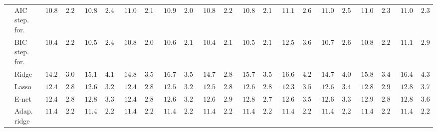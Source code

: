 \begin{tabular}{llllllllllllllllllllll}
	& AIC step. for.  & $\phantom{0}10.882$ & $\phantom{0}2.223$ & $\phantom{0}10.874$ & $\phantom{0}2.487$ & $\phantom{0}11.015$ & $\phantom{0}2.151$ & $\phantom{0}10.903$ & $\phantom{0}2.093$ & $\phantom{0}10.831$ & $\phantom{0}2.217$ & $\phantom{0}10.816$ & $\phantom{0}2.190$ & $\phantom{0}11.148$ & $\phantom{0}2.678$ & $\phantom{0}11.010$ & $\phantom{0}2.523$ & $\phantom{0}11.022$ & $\phantom{0}2.355$ & $\phantom{0}11.032$ & $\phantom{0}2.309$ \\
	& BIC step. for.  & $\phantom{0}10.430$ & $\phantom{0}2.272$ & $\phantom{0}10.569$ & $\phantom{0}2.438$ & $\phantom{0}10.822$ & $\phantom{0}2.084$ & $\phantom{0}10.674$ & $\phantom{0}2.187$ & $\phantom{0}10.434$ & $\phantom{0}2.102$ & $\phantom{0}10.537$ & $\phantom{0}2.125$ & $\phantom{0}12.520$ & $\phantom{0}3.690$ & $\phantom{0}10.759$ & $\phantom{0}2.600$ & $\phantom{0}10.812$ & $\phantom{0}2.296$ & $\phantom{0}11.144$ & $\phantom{0}2.978$ \\
	& Ridge  & $\phantom{0}14.277$ & $\phantom{0}3.091$ & $\phantom{0}15.172$ & $\phantom{0}4.146$ & $\phantom{0}14.822$ & $\phantom{0}3.577$ & $\phantom{0}16.744$ & $\phantom{0}3.571$ & $\phantom{0}14.733$ & $\phantom{0}2.883$ & $\phantom{0}15.737$ & $\phantom{0}3.583$ & $\phantom{0}16.693$ & $\phantom{0}4.239$ & $\phantom{0}14.737$ & $\phantom{0}4.027$ & $\phantom{0}15.851$ & $\phantom{0}3.455$ & $\phantom{0}16.429$ & $\phantom{0}4.332$ \\
	& Lasso  & $\phantom{0}12.491$ & $\phantom{0}2.899$ & $\phantom{0}12.648$ & $\phantom{0}3.262$ & $\phantom{0}12.484$ & $\phantom{0}2.851$ & $\phantom{0}12.557$ & $\phantom{0}3.285$ & $\phantom{0}12.500$ & $\phantom{0}2.852$ & $\phantom{0}12.693$ & $\phantom{0}2.869$ & $\phantom{0}12.366$ & $\phantom{0}3.500$ & $\phantom{0}12.618$ & $\phantom{0}3.418$ & $\phantom{0}12.834$ & $\phantom{0}2.919$ & $\phantom{0}12.849$ & $\phantom{0}3.744$ \\
	& E-net  & $\phantom{0}12.461$ & $\phantom{0}2.874$ & $\phantom{0}12.868$ & $\phantom{0}3.302$ & $\phantom{0}12.424$ & $\phantom{0}2.817$ & $\phantom{0}12.677$ & $\phantom{0}3.273$ & $\phantom{0}12.664$ & $\phantom{0}2.936$ & $\phantom{0}12.810$ & $\phantom{0}2.755$ & $\phantom{0}12.620$ & $\phantom{0}3.569$ & $\phantom{0}12.695$ & $\phantom{0}3.302$ & $\phantom{0}12.918$ & $\phantom{0}2.802$ & $\phantom{0}12.808$ & $\phantom{0}3.678$ \\
	& Adap. ridge  & $\phantom{0}11.482$ & $\phantom{0}2.257$ & $\phantom{0}11.483$ & $\phantom{0}2.258$ & $\phantom{0}11.482$ & $\phantom{0}2.257$ & $\phantom{0}11.482$ & $\phantom{0}2.256$ & $\phantom{0}11.482$ & $\phantom{0}2.257$ & $\phantom{0}11.483$ & $\phantom{0}2.257$ & $\phantom{0}11.477$ & $\phantom{0}2.256$ & $\phantom{0}11.482$ & $\phantom{0}2.258$ & $\phantom{0}11.482$ & $\phantom{0}2.257$ & $\phantom{0}11.481$ & $\phantom{0}2.257$ \\

\end{tabular}
